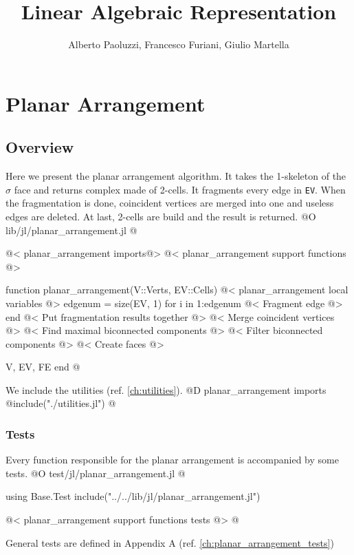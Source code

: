 \documentclass[10pt]{book}
\author{Alberto Paoluzzi, Francesco Furiani, Giulio Martella}
\title{Linear Algebraic Representation}
\begin{document}
\frontmatter
\maketitle
\tableofcontents





\mainmatter

\chapter{Planar Arrangement}
\label{ch:planar_arrangement}

\section{Overview}
Here we present the planar arrangement algorithm. It takes the 1-skeleton of the $\sigma$ face and returns complex made of 2-cells.
It fragments every edge in \texttt{EV}. 
When the fragmentation is done, coincident vertices are merged into one and useless edges are deleted. At last,
2-cells are build and the result is returned.
@O lib/jl/planar_arrangement.jl
@{@< planar\_arrangement imports@>
@< planar\_arrangement support functions @>

function planar_arrangement(V::Verts, EV::Cells)
    @< planar\_arrangement local variables @>
    edgenum = size(EV, 1)
    for i in 1:edgenum
        @< Fragment edge @>
    end
    @< Put fragmentation results together @>
    @< Merge coincident vertices @>
    @< Find maximal biconnected components @>
    @< Filter biconnected components @>
    @< Create faces @>

    V, EV, FE
end 
@}
We include the utilities (ref. \ref{ch:utilities}).
@D planar\_arrangement imports
@{include("./utilities.jl")
@}
\subsection{Tests}
Every function responsible for the planar arrangement is accompanied by some tests. 
@O test/jl/planar_arrangement.jl
@{using Base.Test
include("../../lib/jl/planar_arrangement.jl")

@< planar\_arrangement support functions tests @>
@}
General tests are defined in Appendix A (ref. \ref{ch:planar_arrangement_tests})
\end{document}
